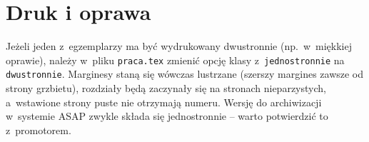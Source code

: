 \section{Druk i oprawa}

Jeżeli jeden z~egzemplarzy ma być wydrukowany dwustronnie (np.\ w~miękkiej
oprawie), należy w~pliku \texttt{praca.tex} zmienić opcję klasy
z~\texttt{jednostronnie} na \texttt{dwustronnie}. Marginesy staną się
wówczas lustrzane (szerszy margines zawsze od strony grzbietu), rozdziały
będą zaczynały się na stronach nieparzystych, a~wstawione strony puste nie
otrzymają numeru. Wersję do archiwizacji w~systemie ASAP zwykle składa się
jednostronnie -- warto potwierdzić to z~promotorem.
